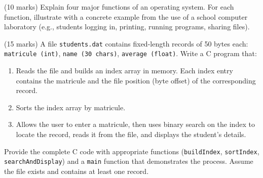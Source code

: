 \documentclass[11pt]{article}
\begin{document}
\begin{exercice} (10 marks)
Explain four major functions of an operating system. For each function, illustrate with a concrete example from the use of a school computer laboratory (e.g., students logging in, printing, running programs, sharing files).
\end{exercice}

\begin{exercice} (15 marks)
A file \texttt{students.dat} contains fixed-length records of 50 bytes each: \texttt{matricule (int)}, \texttt{name (30 chars)}, \texttt{average (float)}. Write a C program that:
\begin{enumerate}
\item Reads the file and builds an index array in memory. Each index entry contains the matricule and the file position (byte offset) of the corresponding record.
\item Sorts the index array by matricule.
\item Allows the user to enter a matricule, then uses binary search on the index to locate the record, reads it from the file, and displays the student's details.
\end{enumerate}
Provide the complete C code with appropriate functions (\texttt{buildIndex}, \texttt{sortIndex}, \texttt{searchAndDisplay}) and a \texttt{main} function that demonstrates the process. Assume the file exists and contains at least one record.
\end{exercice}
\end{document}
